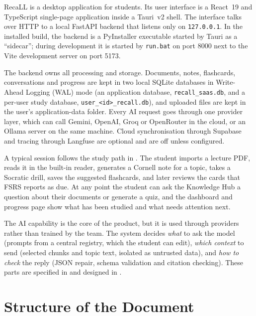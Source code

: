 RecaLL is a desktop application for students. Its user interface is a React~19 and
TypeScript single-page application inside a Tauri~v2 shell. The interface talks over HTTP
to a local FastAPI backend that listens only on \texttt{127.0.0.1}. In the installed
build, the backend is a PyInstaller executable started by Tauri as a ``sidecar''; during
development it is started by \texttt{run.bat} on port 8000 next to the Vite development
server on port 5173.

The backend owns all processing and storage. Documents, notes, flashcards, conversations
and progress are kept in two local SQLite databases in Write-Ahead Logging (WAL) mode
(an application database, \texttt{recall\_saas.db}, and a per-user study database,
\texttt{user\_<id>\_recall.db}), and uploaded files are kept in the user's application-data
folder. Every AI request goes through one provider layer, which can call Gemini, OpenAI,
Groq or OpenRouter in the cloud, or an Ollama server on the same machine. Cloud
synchronisation through Supabase and tracing through Langfuse are optional and are off
unless configured.

A typical session follows the study path in . The student imports a
lecture PDF, reads it in the built-in reader, generates a Cornell note for a topic, takes
a Socratic drill, saves the suggested flashcards, and later reviews the cards that FSRS
reports as due. At any point the student can ask the Knowledge Hub a question about their
documents or generate a quiz, and the dashboard and progress page show what has been
studied and what needs attention next.


The AI capability is the core of the product, but it is used through providers rather than
trained by the team. The system decides \emph{what} to ask the model (prompts from a central
registry, which the student can edit), \emph{which context} to send (selected chunks and
topic text, isolated as untrusted data), and \emph{how to check} the reply (JSON repair,
schema validation and citation checking). These parts are specified in 
and designed in .

\section{Structure of the Document}

